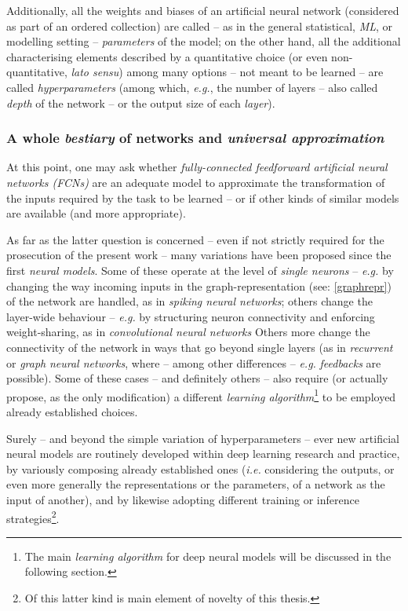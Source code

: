 Additionally, all the weights and biases of an artificial neural network (considered as part of an ordered collection) are called -- as in the general statistical, \textit{ML}, or modelling setting -- \textit{parameters} of the model; on the other hand, all the additional characterising elements described by a quantitative choice (or even non-quantitative, \textit{lato sensu}) among many options -- not meant to be learned -- are called \textit{hyperparameters} (among which, \textit{e.g.}, the number of layers -- also called \textit{depth} of the network -- or the output size of each \textit{layer}).

\subsubsection{A whole \textit{bestiary} of networks and \textit{universal approximation}}

At this point, one may ask whether \textit{fully-connected feedforward artificial neural networks (FCNs)} are an adequate model to approximate the transformation of the inputs required by the task to be learned -- or if other kinds of similar models are available (and more appropriate).

As far as the latter question is concerned -- even if not strictly required for the prosecution of the present work -- many variations have been proposed since the first \textit{neural models}. Some of these operate at the level of \textit{single neurons} -- \textit{e.g.} by changing the way incoming inputs in the graph-representation (see: {\ref{graphrepr}}) of the network are handled, as in \textit{spiking neural networks}; others change the layer-wide behaviour -- \textit{e.g.} by structuring neuron connectivity and enforcing weight-sharing, as in \textit{convolutional neural networks} Others more change the connectivity of the network in ways that go beyond single layers (as in \textit{recurrent} or \textit{graph} \textit{neural networks}, where -- among other differences -- \textit{e.g.} \textit{feedbacks} are possible). Some of these cases -- and definitely others -- also require (or actually propose, as the only modification) a different \textit{learning algorithm}\footnote{The main \textit{learning algorithm} for deep neural models will be discussed in the following section.} to be employed \wrt already established choices.

Surely -- and beyond the simple variation of hyperparameters -- ever new artificial neural models are routinely developed within deep learning research and practice, by variously composing already established ones (\textit{i.e.} considering the outputs, or even more generally the representations or the parameters, of a network as the input of another), and by likewise adopting different training or inference strategies\footnote{Of this latter kind is main element of novelty of this thesis.}.

